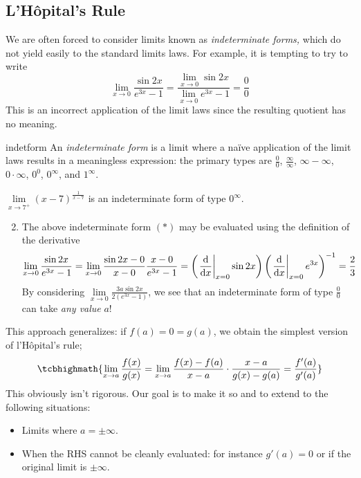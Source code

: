 \goodbreak

\subsection{L'Hôpital's Rule}\label{sec:lhopital}

We are often forced to consider limits known as \emph{indeterminate forms,} which do not yield easily to the standard limits laws. For example, it is tempting to try to write
\[\lim_{x\to 0}\frac{\sin 2x}{e^{3x}-1}=\frac{\lim\limits_{x\to 0}\sin 2x}{\lim\limits_{x\to 0}e^{3x}-1} =\frac 00\tag{$\ast$}\]
This is an incorrect application of the limit laws since the resulting quotient has no meaning.

\begin{defn}{}{indetform}
An \emph{indeterminate form} is a limit where a naïve application of the limit laws results in a meaningless expression: the primary types are $\frac 00$, $\frac\infty\infty$, $\infty-\infty$, $0\cdot\infty$, $0^0$, $0^\infty$, and $1^\infty$.
\end{defn}

\begin{examples}{}{}
\exstart $\lim\limits_{x\to 7^+}(x-7)^\frac 1{x-7}$ is an indeterminate form of type $0^\infty$.
\begin{enumerate}\setcounter{enumi}{1}
  \item The above indeterminate form $(\ast)$ may be evaluated using the definition of the derivative
	\[\lim_{x\to 0}\frac{\sin 2x}{e^{3x}-1}= \lim_{x\to 0}\frac{\sin 2x-0}{x-0}\frac{x-0}{e^{3x}-1} =\left(\left.\frac{\mathrm{d} }{\mathrm{d} x}\right|_{x=0}\sin 2x\right) \left(\left.\frac{\mathrm{d} }{\mathrm{d} x}\right|_{x=0}e^{3x}\right)^{-1} =\frac 23\]
	By considering $\lim\limits_{x\to 0}\frac{3a\sin 2x}{2(e^{3x}-1)}$, we see that an indeterminate form of type $\frac 00$ can take \emph{any value} $a$!
\end{enumerate}
\end{examples}

This approach generalizes: if $f(a)=0=g(a)$, we obtain the simplest version of l'Hôpital's rule;
\[\tcbhighmath{\lim_{x\to a}\frac{f(x)}{g(x)}=\lim_{x\to a}\frac{f(x)-f(a)}{x-a}\cdot \frac{x-a}{g(x)-g(a)} =\frac{f'(a)}{g'(a)}}\]
This obviously isn't rigorous. Our goal is to make it so and to extend to the following situations:
\begin{itemize}
  \item Limits where $a=\pm\infty$.
  \item When the RHS cannot be cleanly evaluated: for instance $g'(a)=0$ or if the original limit is $\pm\infty$.
\end{itemize}

